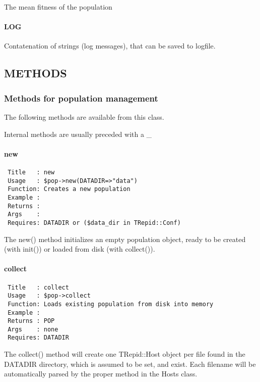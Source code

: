 The mean fitness of the population

\paragraph*{LOG\label{LOG}}


Contatenation of strings (log messages), that can be saved to logfile.

\subsection{METHODS\label{METHODS}}
\subsubsection*{Methods for population management\label{Methods_for_population_management}}


The following methods are available from this class.



Internal methods are usually preceded with a \_

\paragraph*{new\label{new}}
\begin{verbatim}
 Title   : new
 Usage   : $pop->new(DATADIR=>"data")
 Function: Creates a new population
 Example :
 Returns :
 Args    : 
 Requires: DATADIR or ($data_dir in TRepid::Conf)
\end{verbatim}


The new() method initializes an empty population object, ready to be
created (with init()) or loaded from disk (with collect()).

\paragraph*{collect\label{collect}}
\begin{verbatim}
 Title   : collect
 Usage   : $pop->collect
 Function: Loads existing population from disk into memory
 Example :
 Returns : POP
 Args    : none
 Requires: DATADIR
\end{verbatim}


The collect() method will create one TRepid::Host object per file
found in the DATADIR directory, which is assumed to be set, and
exist. Each filename will be automatically parsed by the proper method
in the Hosts class.

